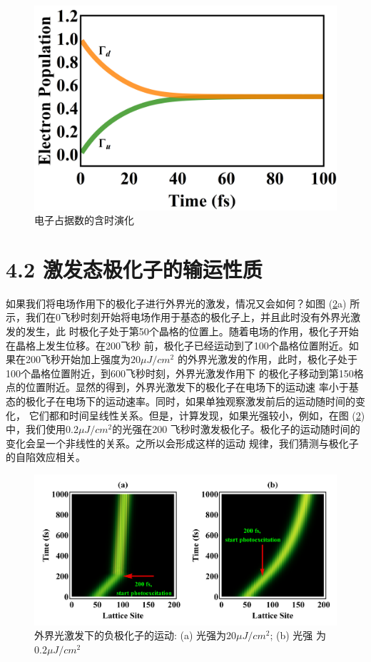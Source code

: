 \documentclass[12pt,]{report}
\begin{document}
\begin{figure}[h!]
    \centering
    \includegraphics[scale=0.5]{./figures/pop42.png}
    \caption{电子占据数的含时演化}
    \label{fig:pop42}
\end{figure}

\section{4.2
激发态极化子的输运性质}\label{ux6fc0ux53d1ux6001ux6781ux5316ux5b50ux7684ux8f93ux8fd0ux6027ux8d28}

如果我们将电场作用下的极化子进行外界光的激发，情况又会如何？如图
(\ref{fig:epolaron2}a)
所示，我们在0飞秒时刻开始将电场作用于基态的极化子上，并且此时没有外界光激发的发生，此
时极化子处于第50个晶格的位置上。随着电场的作用，极化子开始在晶格上发生位移。在200飞秒
前，极化子已经运动到了100个晶格位置附近。如果在200飞秒开始加上强度为\(20\mu J/cm^2\)
的外界光激发的作用，此时，极化子处于100个晶格位置附近，到600飞秒时刻，外界光激发作用下
的极化子移动到第150格点的位置附近。显然的得到，外界光激发下的极化子在电场下的运动速
率小于基态的极化子在电场下的运动速率。同时，如果单独观察激发前后的运动随时间的变化，
它们都和时间呈线性关系。但是，计算发现，如果光强较小，例如，在图
(\ref{fig:epolaron2})中，我们使用\(0.2\mu J/cm^2\)的光强在200
飞秒时激发极化子。极化子的运动随时间的变化会呈一个非线性的关系。之所以会形成这样的运动
规律，我们猜测与极化子的自陷效应相关。

\begin{figure}[h!]
    \centering
    \includegraphics[scale=0.5]{./figures/epolaron2.png}
    \caption{外界光激发下的负极化子的运动: (a) 光强为$20\mu J/cm^2$; (b) 光强
    为$0.2\mu J/cm^2$ }
    \label{fig:epolaron2}
\end{figure}
\end{document}
